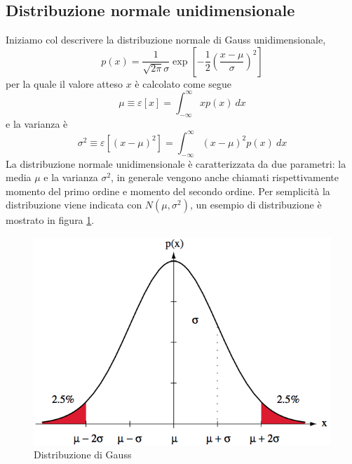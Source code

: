 \subsection{Distribuzione normale unidimensionale}
Iniziamo col descrivere la distribuzione normale di Gauss unidimensionale,
\begin{equation}
p(x) = \frac{1}{\sqrt{2\pi} \sigma} \exp  \left [ -\frac{1}{2}  \left (  \frac{x - \mu}{\sigma} \right )^2 \right  ]
\end{equation}
per la quale il valore atteso $x$ è calcolato come segue
\begin{equation}
\mu \equiv \varepsilon [x] = \int_{-\infty}^{\infty} xp(x) \ dx
\end{equation}
e la varianza è
\begin{equation}
\sigma^2 \equiv \varepsilon [(x - \mu)^2] = \int_{-\infty}^{\infty} (x - \mu)^2 p(x) \ dx
\end{equation}
La distribuzione normale unidimensionale è caratterizzata da due parametri: la media $\mu$ e la varianza $\sigma^2$, in generale vengono anche chiamati rispettivamente momento del primo ordine e momento del secondo ordine. Per semplicità la distribuzione viene indicata con $N(\mu, \sigma^2)$, un esempio di distribuzione è mostrato in figura \ref{gauss}.\\
\begin{figure}
\centering
\includegraphics[scale=0.5]{img/gauss.png}
\caption{Distribuzione di Gauss}
\label{gauss}
\end{figure}

